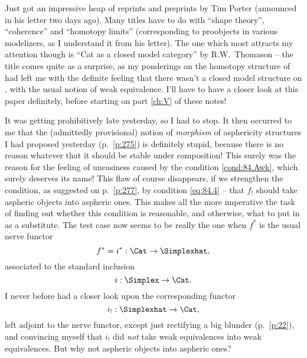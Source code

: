 \bigbreak
\presectionfill{}\par

\label{sec:85}%
Just got an impressive heap of reprints and preprints by Tim Porter
(announced in his letter two days ago). Many titles have to do with
``shape theory'', ``coherence'' and ``homotopy limits'' (corresponding
to proobjects in various modelizers, as I understand it from his
letter). The one which most attracts my attention though is ``Cat as a
closed model category'' by
R.W.~Thomason -- the title comes
quite as a surprise, as my ponderings on the homotopy structure of
\Cat{} had left me with the definite feeling that there wasn't a
closed model structure on \Cat, with the usual notion of weak
equivalence. I'll have to have a closer look at this paper definitely,
before starting on part \ref{ch:V} of these notes!

It was getting prohibitively late yesterday, so I had to stop. It then
occurred to me that the (admittedly provisional) notion of
\emph{morphism} of asphericity structures I had proposed yesterday
(p.\ \ref{p:275}) is definitely stupid, because there is no reason
whatever that it should be stable under composition! This surely was
the reason for the feeling of uneasiness caused by the
condition \ref{cond:84.Awk}, which surely deserves its name! This flaw
of course disappears, if we strengthen the condition, as suggested on
p.\ \ref{p:277}, by condition \ref{eq:84.4} -- that $f_!$ should take
aspheric objects into aspheric ones. This makes all the more
imperative the task of finding out whether this condition is
reasonable, and otherwise, what to put in as a substitute. The test
case now seems to be really the one when $f^*$ is the usual nerve
functor
\[f^*=i^*:\Cat\to\Simplexhat,\]
associated to the standard inclusion
\[i:\Simplex\to\Cat.\]
I never before had a closer look upon the corresponding functor
\[i_!:\Simplexhat\to\Cat,\]
left adjoint to the nerve functor, except just rectifying a big
blunder (p.\ \ref{p:22}), and convincing myself that $i_!$ did
\emph{not} take weak equivalences into weak equivalences. But why not
aspheric objects into aspheric ones?

